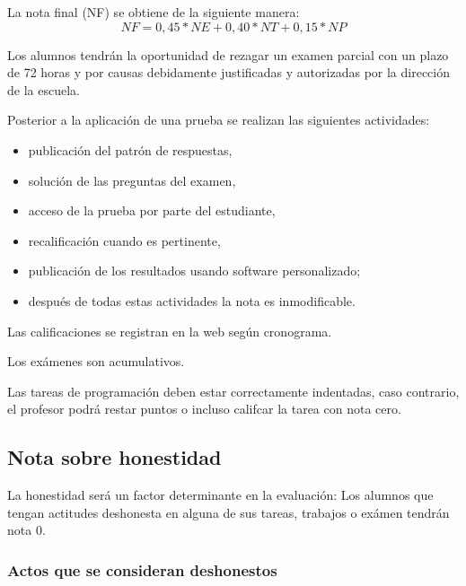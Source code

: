\documentclass{article}
\begin{document}
\begin{requirements}
La nota final (NF) se obtiene de la siguiente manera: 
  \begin{equation*}
  NF = 0,45 * NE + 0,40 * NT + 0,15 * NP
  \end{equation*}

Los alumnos tendrán la oportunidad de rezagar un examen parcial con un plazo de 72 horas y por causas debidamente justificadas y autorizadas por la dirección de la escuela.

Posterior a la aplicación de una prueba se realizan las siguientes actividades:
  \begin{itemize}
    \item publicación del patrón de respuestas,
    \item solución de las preguntas del examen,
    \item acceso de la prueba por parte del estudiante,
    \item recalificación cuando es pertinente,
    \item publicación de los resultados usando software personalizado;
    \item después de todas estas actividades la nota es inmodificable.
  \end{itemize}

Las calificaciones se registran en la web según cronograma.

Los exámenes son acumulativos.

Las tareas de programación deben estar correctamente indentadas, caso contrario, el profesor podrá restar puntos o incluso califcar la tarea con nota cero.

\subsection*{Nota sobre honestidad}

La honestidad será un factor determinante en la evaluación: Los alumnos que tengan actitudes deshonesta en alguna de sus tareas, trabajos o exámen tendrán nota 0.

\subsubsection*{Actos que se consideran deshonestos}


\end{requirements}
\end{document}
